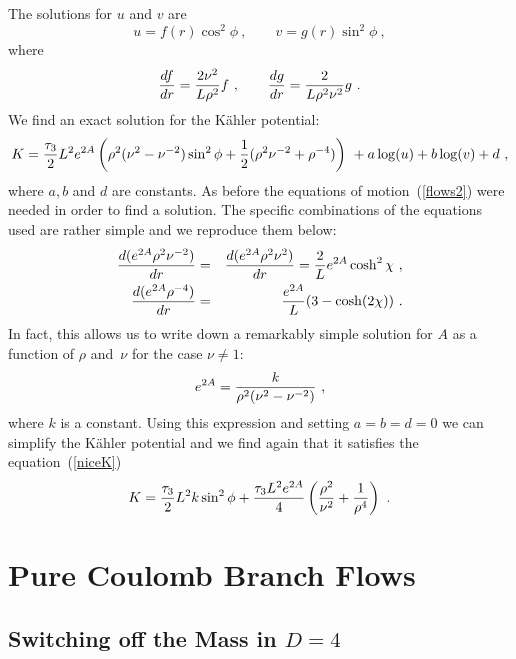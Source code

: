 \documentclass[a4paper,12pt]{article}
\newcommand{\labell}[1]{\label{#1}}
\newcommand{\reef}[1]{(\ref{#1})}
\begin{document}
The solutions for $u$ and $v$ are 
\begin{equation}
u = f(r) \cos^2 \phi\ , \qquad v = g(r) \sin^2 \phi\ ,  \nonumber
\end{equation}
where
\begin{equation}
{df \over dr} = {2 \nu^2 \over {L \rho^2}}f\ , \qquad {dg \over dr} = {2 \over {L \rho^2 \nu^2}}g\ .
\labell{N1-coulomb-vars}
\end{equation} 
We find an exact solution for the K\"ahler potential:
\begin{equation}
K = {\tau_3 \over 2} L^2 e^{2A} \left( \rho^2(\nu^2 - \nu^{-2}) \sin^2 \phi  + {1 \over 2} (\rho^2 \nu^{-2} + \rho^{-4}) \right)\ + a\log(u) + b\log(v) + d\ ,
\end{equation}
where $a,b$ and $d$ are constants.  As before the equations of
motion~\reef{flows2} were needed in order to find a solution. The
specific combinations of the equations used are rather simple and we
reproduce them below:
\begin{eqnarray} 
{d (e^{2A} \rho^2 \nu^{-2}) \over d r} & = & {d (e^{2A} \rho^2 \nu^{2}) \over d r} =  {2 \over L} e^{2A} \cosh^2 \chi \ , \labell{N1-coulomb-a} \nonumber\\
{d (e^{2A} \rho^{-4}) \over dr} & = & {e^{2A} \over L} (3 - \cosh(2\chi))\ .
\labell{N1-coulomb-b}
\end{eqnarray}
In fact, this allows us to write down a remarkably simple solution for
$A$ as a function of $\rho$ and~$\nu$ for the case $\nu\neq1$:
\begin{equation}
e^{2A} =  {k \over \rho^2 (\nu^2 - \nu^{-2})}\ ,
\labell{N1-coulomb-c}
\end{equation}
where $k$ is a constant.  Using this expression and setting $a=b=d=0$
we can simplify the K\"ahler potential and we find again that it
satisfies the equation~\reef{niceK}
\begin{equation}
  K =  {\tau_3 \over 2} L^2 k \sin^2 \phi  + {\tau_3 L^2 e^{2A} \over 4} 
\left(\frac{\rho^2}{\nu^2} + \frac{1}{\rho^4}\right)\ .
\labell{N1-coulomb-K}
\end{equation}

\section{Pure Coulomb Branch Flows}
\label{coulombic}

\subsection{Switching off the Mass in $D=4$}
\end{document}
